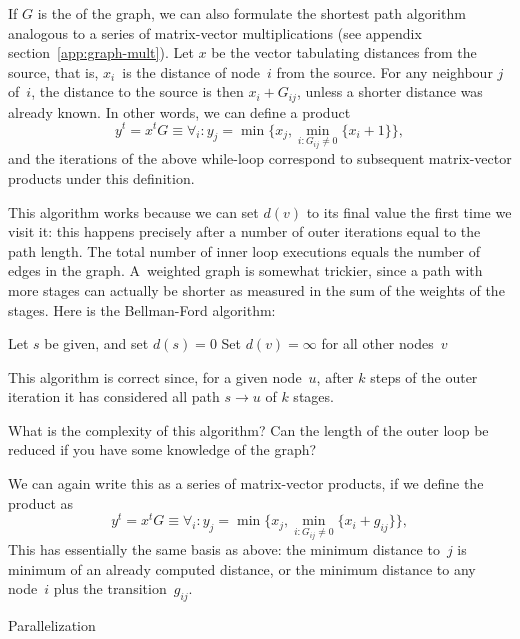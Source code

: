 If $G$ is the  of the graph, we can
also formulate the shortest path algorithm analogous to a series of
matrix-vector multiplications (see appendix
section~\ref{app:graph-mult}). Let $x$ be the vector tabulating distances
from the source, that is, $x_i$~is the distance of node~$i$ from the source.
For any neighbour $j$ of~$i$, the distance to the source is then $x_i+G_{ij}$,
unless a shorter distance was already known.
In other words, we can define a product
\[ y^t=x^tG\equiv \forall_i\colon
  y_j = \min\bigl\{ x_j, \min_{i\colon G_{ij}\not=0} \{x_i+1\} \bigr\},
\]
and the iterations of the above while-loop correspond to subsequent
matrix-vector products under this definition.

This algorithm works because we can set $d(v)$ to its final value
the first time we visit it: this happens precisely after a number of
outer iterations equal to the path length. The total number of inner loop
executions equals the number of edges in the graph.
A~weighted graph is somewhat trickier,
since a path with more stages can actually be shorter as measured in the sum
of the weights of the stages. Here is the Bellman-Ford algorithm:

\begin{displayalgorithm}
  Let $s$ be given, and set $d(s)=0$\;
  Set $d(v)=\infty$ for all other nodes~$v$\;
\end{displayalgorithm}

This algorithm is correct since, for a given node~$u$, after $k$ steps
of the outer iteration it has considered all path $s\rightarrow u$ of
$k$ stages.

\begin{exercise}
  What is the complexity of this algorithm? Can the length of the
  outer loop be reduced if you have some knowledge of the graph?
\end{exercise}

We can again write this as a series of matrix-vector products, if we define
the product as
\[ y^t=x^tG\equiv \forall_i\colon
  y_j = \min\bigl\{ x_j, \min_{i\colon G_{ij}\not=0} \{x_i+g_{ij}\} \bigr\},
\]
This has essentially the same basis as above: the minimum distance to~$j$
is minimum of an already computed distance, or the minimum distance to any node~$i$
plus the transition~$g_{ij}$.

 {Parallelization}

